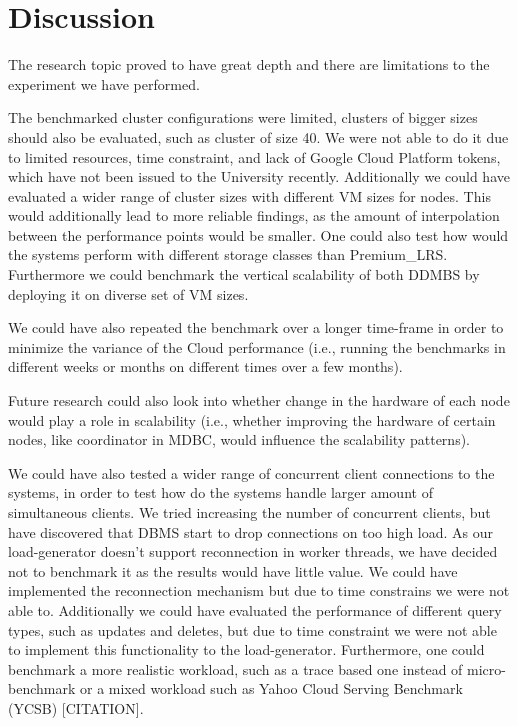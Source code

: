 \section{Discussion}
\label{cha:discussion}

The research topic proved to have great depth and there are limitations to the experiment we have performed.

The benchmarked cluster configurations were limited, clusters of bigger sizes should also be evaluated, such as cluster of size 40.
We were not able to do it due to limited resources, time constraint, and lack of Google Cloud Platform tokens, which have not been issued to the University recently.
Additionally we could have evaluated a wider range of cluster sizes with different VM sizes for nodes.
This would additionally lead to more reliable findings, as the amount of interpolation between the performance points would be smaller.
One could also test how would the systems perform with different storage classes than Premium\_LRS.
Furthermore we could benchmark the vertical scalability of both DDMBS by deploying it on diverse set of VM sizes.

We could have also repeated the benchmark over a longer time-frame in order to minimize the variance of the Cloud performance
(i.e., running the benchmarks in different weeks or months on different times over a few months).

Future research could also look into whether change in the hardware of each node would play a role in scalability 
(i.e., whether improving the hardware of certain nodes, like coordinator in MDBC, would influence the scalability patterns).

We could have also tested a wider range of concurrent client connections to the systems, in order to test how do the systems handle larger amount of simultaneous clients.
We tried increasing the number of concurrent clients, but have discovered that DBMS start to drop connections on too high load.
As our load-generator doesn't support reconnection in worker threads, we have decided not to benchmark it as the results would have little value.
We could have implemented the reconnection mechanism but due to time constrains we were not able to.
Additionally we could have evaluated the performance of different query types, such as updates and deletes, but due to time constraint we were not able to implement this functionality to the load-generator.
Furthermore, one could benchmark a more realistic workload, such as a trace based one instead of micro-benchmark or a mixed workload such as Yahoo Cloud Serving Benchmark (YCSB) [CITATION].

